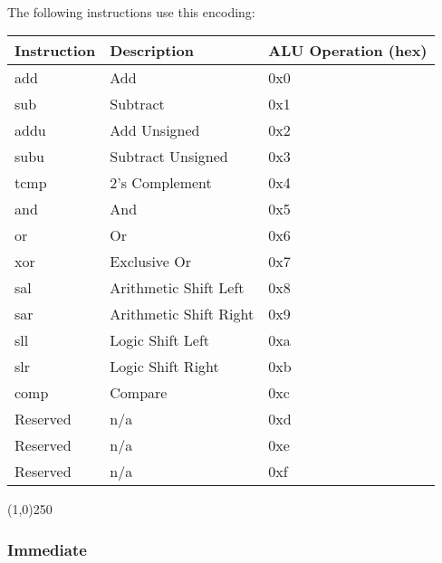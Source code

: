 \documentclass[letterpaper, 11pt]{article}
\begin{document}
\paragraph{}The following instructions use this encoding:\\
\begin{center}
	\begin{longtable}{|l|l|l|}\hline
			Instruction & Description 				& ALU Operation (hex) \\ \hline
			add			& Add 						& 0x0 \\ \hline
			sub 		& Subtract					& 0x1 \\ \hline
			addu 		& Add Unsigned 				& 0x2 \\ \hline
			subu		& Subtract Unsigned 		& 0x3 \\ \hline
			tcmp		& 2's Complement			& 0x4 \\ \hline
			and			& And						& 0x5 \\ \hline
			or			& Or						& 0x6 \\ \hline
			xor			& Exclusive Or				& 0x7 \\ \hline
			sal			& Arithmetic Shift Left		& 0x8 \\ \hline
			sar			& Arithmetic Shift Right	& 0x9 \\ \hline
			sll			& Logic Shift Left			& 0xa \\ \hline
			slr			& Logic Shift Right			& 0xb \\ \hline
			comp		& Compare					& 0xc \\ \hline
			Reserved	& n/a						& 0xd \\ \hline
			Reserved	& n/a						& 0xe \\ \hline
			Reserved	& n/a						& 0xf \\ \hline

\end{longtable}
\end{center}
\begin{center}
	\line(1,0){250}
\end{center}

\newpage
\subsubsection{Immediate}
\end{document}
